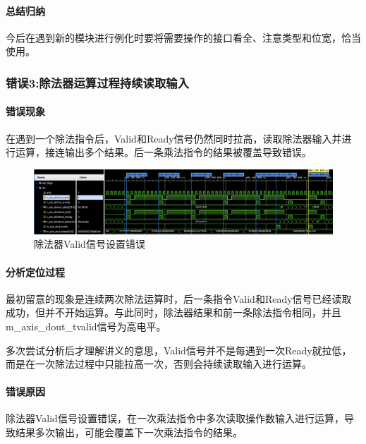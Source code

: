 \documentclass[UTF-8,twoside,c5size]{ctexart}
\begin{document}
	\paragraph{总结归纳}\hfill
	
	今后在遇到新的模块进行例化时要将需要操作的接口看全、注意类型和位宽，恰当使用。
	
	\subsubsection{错误3:除法器运算过程持续读取输入}
	
	\paragraph{错误现象}\hfill
	
	在遇到一个除法指令后，Valid和Ready信号仍然同时拉高，读取除法器输入并进行运算，接连输出多个结果。后一条乘法指令的结果被覆盖导致错误。
	
	\begin{figure}[h]
		\centering
		\includegraphics[width=1\linewidth]{pictures/valid_error.png}
		\caption[valid\_errpr]{除法器Valid信号设置错误}
		\label{fig:validerror}
	\end{figure}
	
	
	\paragraph{分析定位过程}\hfill
	
	最初留意的现象是连续两次除法运算时，后一条指令Valid和Ready信号已经读取成功，但并不开始运算。与此同时，除法器结果和前一条除法指令相同，并且m\_axis\_dout\_tvalid信号为高电平。
	
	多次尝试分析后才理解讲义的意思，Valid信号并不是每遇到一次Ready就拉低，而是在一次除法过程中只能拉高一次，否则会持续读取输入进行运算。
	
	\paragraph{错误原因}\hfill
	
	除法器Valid信号设置错误，在一次乘法指令中多次读取操作数输入进行运算，导致结果多次输出，可能会覆盖下一次乘法指令的结果。
	
\end{document}
